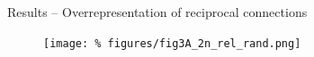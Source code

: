 \begin{frame}{Results -- Overrepresentation of reciprocal connections}

  \begin{figure}
    \centering
    \texttt{[image: \%
      figures/fig3A\_2n\_rel\_rand.png]} %
  \end{figure}
  
  
  
\end{frame}



